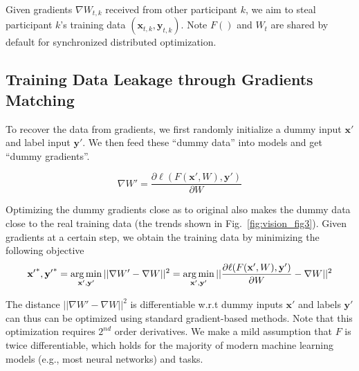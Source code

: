 Given gradients $\nabla W_{t, k}$ received from other participant $k$, we aim to steal participant $k$'s training data $(\mathbf{x}_{t, k}, \mathbf{y}_{t, k})$. Note $F()$ and $W_{t}$ are shared by default for synchronized distributed optimization.


\subsection{Training Data Leakage through Gradients Matching}\label{sec:algorithm}


To recover the data from gradients, we first randomly initialize a dummy input $\mathbf{x'}$ and label input $\mathbf{y'}$. We then feed these ``dummy data'' into models and get ``dummy gradients''.

\begin{equation}
\nabla W' = \frac{
        \partial \ell (F(\mathbf{x}', W), \mathbf{y}' ) 
    }{
        \partial W
    }
\end{equation}

Optimizing the dummy gradients close as to original also makes the dummy data close to the real training data (the trends shown in Fig.~\ref{fig:vision_fig3}). Given gradients at a certain step, we obtain the training data by minimizing the following objective 
\begin{align}
\begin{split}
\mathbf{x'}^{*}, \mathbf{y'}^{*}
    = \operatorname*{arg\,min}_{\mathbf{x'}, \mathbf{y}'} ||\nabla W' - \nabla W||^2 
    = \operatorname*{arg\,min}_{\mathbf{x'}, \mathbf{y}'} || 
        \frac{\partial \ell (F(\mathbf{x}', W), \mathbf{y}')}{\partial W} -
        \nabla W
    ||^2
\end{split}
\end{align}

The distance $||\nabla W' - \nabla W||^2$ is differentiable w.r.t dummy inputs $\mathbf{x'}$ and labels $\mathbf{y'}$ can thus can be optimized using standard gradient-based methods. Note that this optimization requires $2^{nd}$ order derivatives. We make a mild assumption that $F$ is twice differentiable, which holds for the majority of modern machine learning models (e.g., most neural networks) and tasks. 

